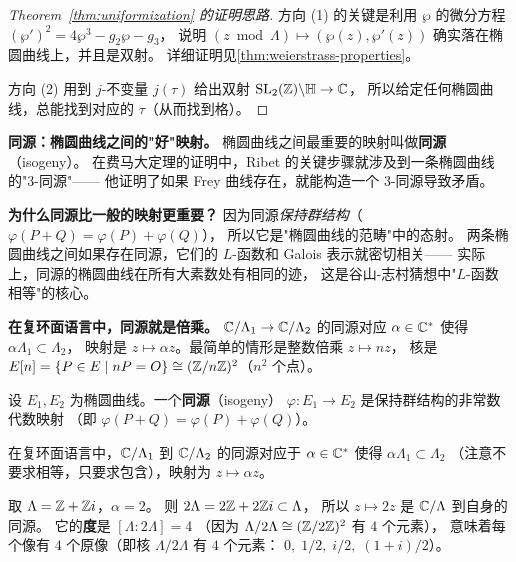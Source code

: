 \begin{proof}[Theorem~\ref{thm:uniformization} 的证明思路]
方向 (1) 的关键是利用 $\wp$ 的微分方程
$(\wp')^2 = 4\wp^3 - g_2\wp - g_3$，
说明 $(z \bmod \Lambda) \mapsto (\wp(z), \wp'(z))$
确实落在椭圆曲线上，并且是双射。
详细证明见\cref{thm:weierstrass-properties}。

方向 (2) 用到 $j$-不变量 $j(\tau)$ 给出双射
$\mathrm{SL}_2(\mathbb{Z}) \backslash \mathbb{H} \to \mathbb{C}$，
所以给定任何椭圆曲线，总能找到对应的 $\tau$（从而找到格）。
\end{proof}

\textbf{同源：椭圆曲线之间的"好"映射。}
椭圆曲线之间最重要的映射叫做\textbf{同源}（isogeny）。
在费马大定理的证明中，Ribet 的关键步骤就涉及到一条椭圆曲线的"$3$-同源"——
他证明了如果 Frey 曲线存在，就能构造一个 $3$-同源导致矛盾。

\textbf{为什么同源比一般的映射更重要？}
因为同源\emph{保持群结构}（$\varphi(P+Q) = \varphi(P)+\varphi(Q)$），
所以它是"椭圆曲线的范畴"中的态射。
两条椭圆曲线之间如果存在同源，它们的 $L$-函数和 Galois 表示就密切相关——
实际上，同源的椭圆曲线在所有大素数处有相同的迹，
这是谷山-志村猜想中"$L$-函数相等"的核心。

\textbf{在复环面语言中，同源就是倍乘。}
$\mathbb{C}/\Lambda_1 \to \mathbb{C}/\Lambda_2$ 的同源对应 $\alpha \in \mathbb{C}^*$ 使得 $\alpha\Lambda_1 \subset \Lambda_2$，
映射是 $z \mapsto \alpha z$。最简单的情形是整数倍乘 $z \mapsto nz$，
核是 $E[n] = \{P \in E \mid nP = O\} \cong (\mathbb{Z}/n\mathbb{Z})^2$（$n^2$ 个点）。

\begin{definition}[同源]
\label{def:isogeny}
设 $E_1, E_2$ 为椭圆曲线。一个\textbf{同源}（isogeny）
$\varphi\colon E_1 \to E_2$ 是保持群结构的非常数代数映射
（即 $\varphi(P + Q) = \varphi(P) + \varphi(Q)$）。

在复环面语言中，$\mathbb{C}/\Lambda_1$ 到 $\mathbb{C}/\Lambda_2$ 的同源对应于
$\alpha \in \mathbb{C}^*$ 使得 $\alpha\Lambda_1 \subset \Lambda_2$
（注意不要求相等，只要求包含），映射为 $z \mapsto \alpha z$。
\end{definition}

\begin{example}[乘法同源]
\label{ex:multiplication-isogeny}
取 $\Lambda = \mathbb{Z} + \mathbb{Z} i$，$\alpha = 2$。
则 $2\Lambda = 2\mathbb{Z} + 2\mathbb{Z} i \subset \Lambda$，
所以 $z \mapsto 2z$ 是 $\mathbb{C}/\Lambda$ 到自身的同源。
它的\textbf{度}是 $[\Lambda : 2\Lambda] = 4$
（因为 $\Lambda/2\Lambda \cong (\mathbb{Z}/2\mathbb{Z})^2$ 有 $4$ 个元素），
意味着每个像有 $4$ 个原像（即核 $\Lambda/2\Lambda$ 有 $4$ 个元素：
$0, \; 1/2, \; i/2, \; (1+i)/2$）。
\end{example}



